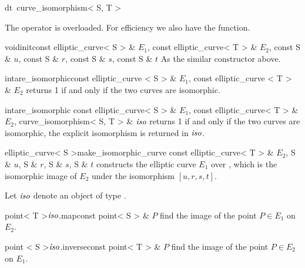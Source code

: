\begin{fcode}{dt}{~curve_isomorphism< S, T >}{}
\end{fcode}



\ASGN

The operator \code{=} is overloaded.  For efficiency we also have the function.

\begin{fcode}{void}{init}{const elliptic_curve< S > & $E_1$,
    const elliptic_curve< T > & $E_2$, const S & $u$, const S & $r$, const S & $s$, const S & $t$}%
  As the similar constructor above.
\end{fcode}



\HIGH

\begin{fcode}{int}{are_isomorphic}{const elliptic_curve < S > & $E_1$, const elliptic_curve < T > & $E_2$}
  returns 1 if and only if the two curves are isomorphic.
\end{fcode}

\begin{fcode}{int}{are_isomorphic} {const elliptic_curve< S > & $E_1$,
    const elliptic_curve< T > & $E_2$, curve_isomorphism< S, T > & $\mathit{iso}$}%
  returns 1 if and only if the two curves are isomorphic, the explicit isomorphism is returned
  in $\mathit{iso}$.
\end{fcode}

\begin{fcode}{elliptic_curve< S >}{make_isomorphic_curve} {const elliptic_curve< T > & $E_2$, S & $u$,
    S & $r$, S & $s$, S & $t$}%
  constructs the elliptic curve $E_1$ over , which is the isomorphic image of $E_2$
  under the isomorphism $[u,r,s,t]$.
\end{fcode}

Let $\mathit{iso}$ denote an object of type .

\begin{cfcode}{point< T >}{$\mathit{iso}$.map}{const point< S > & $P$}
  find the image of the point $P \in E_1$ on $E_2$.
\end{cfcode}

\begin{cfcode}{point < S >}{$\mathit{iso}$.inverse}{const point< T > & $P$}
  find the image of the point $P \in E_2$ on $E_1$.
\end{cfcode}

